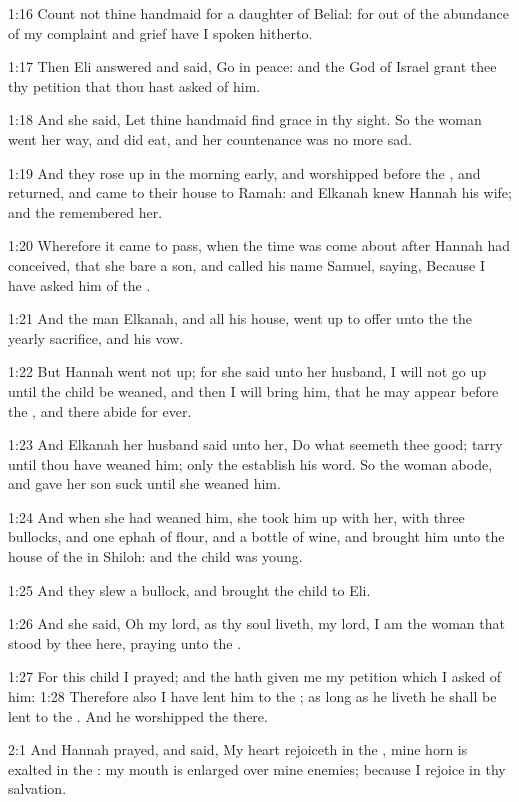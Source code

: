 1:16 Count not thine handmaid for a daughter of Belial: for out of the abundance of my complaint and grief have I spoken hitherto.

1:17 Then Eli answered and said, Go in peace: and the God of Israel grant thee thy petition that thou hast asked of him.

1:18 And she said, Let thine handmaid find grace in thy sight. So the woman went her way, and did eat, and her countenance was no more sad.

1:19 And they rose up in the morning early, and worshipped before the \LORD, and returned, and came to their house to Ramah: and Elkanah knew Hannah his wife; and the \LORD remembered her.

1:20 Wherefore it came to pass, when the time was come about after Hannah had conceived, that she bare a son, and called his name Samuel, saying, Because I have asked him of the \LORD.

1:21 And the man Elkanah, and all his house, went up to offer unto the \LORD the yearly sacrifice, and his vow.

1:22 But Hannah went not up; for she said unto her husband, I will not go up until the child be weaned, and then I will bring him, that he may appear before the \LORD, and there abide for ever.

1:23 And Elkanah her husband said unto her, Do what seemeth thee good; tarry until thou have weaned him; only the \LORD establish his word. So the woman abode, and gave her son suck until she weaned him.

1:24 And when she had weaned him, she took him up with her, with three bullocks, and one ephah of flour, and a bottle of wine, and brought him unto the house of the \LORD in Shiloh: and the child was young.

1:25 And they slew a bullock, and brought the child to Eli.

1:26 And she said, Oh my lord, as thy soul liveth, my lord, I am the woman that stood by thee here, praying unto the \LORD.

1:27 For this child I prayed; and the \LORD hath given me my petition which I asked of him: 1:28 Therefore also I have lent him to the \LORD; as long as he liveth he shall be lent to the \LORD. And he worshipped the \LORD there.

2:1 And Hannah prayed, and said, My heart rejoiceth in the \LORD, mine horn is exalted in the \LORD: my mouth is enlarged over mine enemies; because I rejoice in thy salvation.

